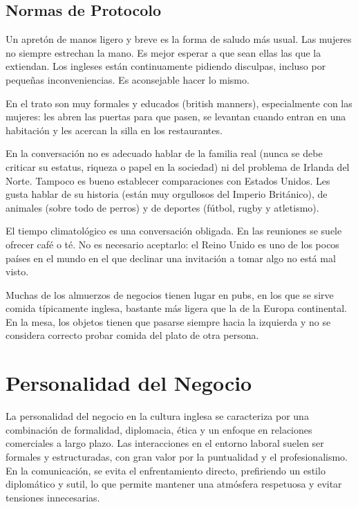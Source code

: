 \documentclass[letterpaper, 12pt]{article}
\begin{document}
\subsection*{Normas de Protocolo}

Un apretón de manos ligero y breve es la forma de saludo más usual. Las mujeres
no siempre estrechan la mano. Es mejor esperar a que sean ellas las que la
extiendan. Los ingleses están continuamente pidiendo disculpas, incluso por
pequeñas inconveniencias. Es aconsejable hacer lo mismo.

En el trato son muy formales y educados (british manners), especialmente con
las mujeres: les abren las puertas para que pasen, se levantan cuando entran en
una habitación y les acercan la silla en los restaurantes.

En la conversación no es adecuado hablar de la familia real (nunca se debe
criticar su estatus, riqueza o papel en la sociedad) ni del problema de Irlanda
del Norte. Tampoco es bueno establecer comparaciones con Estados Unidos. Les
gusta hablar de su historia (están muy orgullosos del Imperio Británico), de
animales (sobre todo de perros) y de deportes (fútbol, rugby y atletismo).

El tiempo climatológico es una conversación obligada. En las reuniones se suele
ofrecer café o té. No es necesario aceptarlo: el Reino Unido es uno de los
pocos países en el mundo en el que declinar una invitación a tomar algo no está
mal visto.

Muchas de los almuerzos de negocios tienen lugar en pubs, en los que se sirve
comida típicamente inglesa, bastante más ligera que la de la Europa
continental. En la mesa, los objetos tienen que pasarse siempre hacia la
izquierda y no se considera correcto probar comida del plato de otra persona.

\section*{Personalidad del Negocio}

La personalidad del negocio en la cultura inglesa se caracteriza por una
combinación de formalidad, diplomacia, ética y un enfoque en relaciones
comerciales a largo plazo. Las interacciones en el entorno laboral suelen ser
formales y estructuradas, con gran valor por la puntualidad y el
profesionalismo. En la comunicación, se evita el enfrentamiento directo,
prefiriendo un estilo diplomático y sutil, lo que permite mantener una
atmósfera respetuosa y evitar tensiones innecesarias.
\end{document}
